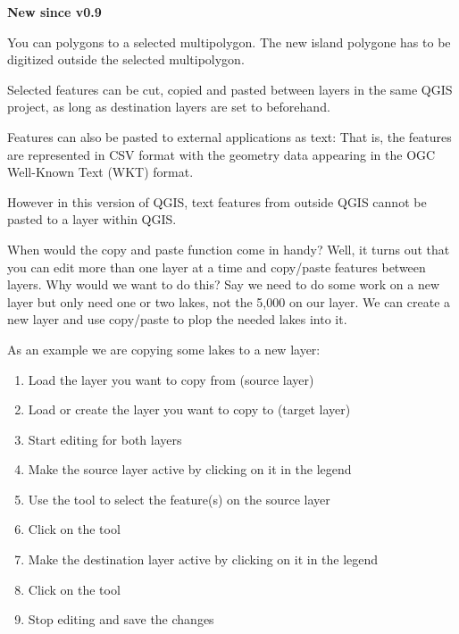\textbf{New since v0.9}

You can  polygons to a selected multipolygon. 
The new island polygone 
has to be digitized outside the selected multipolygon. 



Selected features can be cut, copied and pasted between layers in the
same QGIS project, as long as destination layers are set to 
 beforehand.

Features can also be pasted to external applications as text:  That is,
the features are represented in CSV format with the geometry data appearing 
in the OGC Well-Known Text (WKT) format.

However in this version of QGIS, text features from outside QGIS cannot 
be pasted to a layer within QGIS.

When would the copy and paste function come in handy? Well, it turns out that 
you can edit more than one layer at a time and copy/paste features between 
layers. Why would we want to do this?  Say we need to do some work on a new 
layer but only need one or two lakes, not the 5,000 on our  
layer. We can create a new layer and use copy/paste to plop the needed lakes 
into it. 

As an example we are copying some lakes to a new layer:

\begin{enumerate}
\item Load the layer you want to copy from (source layer)
\item Load or create the layer you want to copy to (target layer) 
\item Start editing for both layers 
\item Make the source layer active by clicking on it in the legend 
\item Use the  tool to select the feature(s) on the source layer
\item Click on the  tool
\item Make the destination layer active by clicking on it in the legend 
\item Click on the  tool 
\item Stop editing and save the changes
\end{enumerate}

